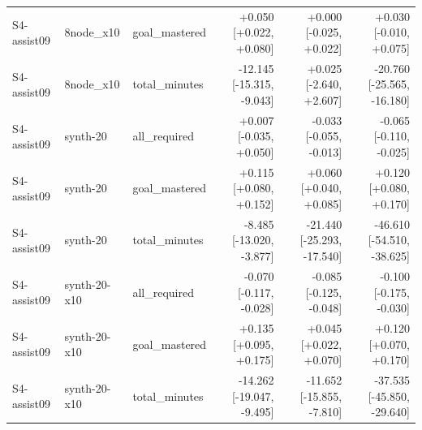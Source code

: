 \begin{table}[htbp]
\begin{tabular}{lllrrr}
S4-assist09 & 8node\_x10 & goal\_mastered & +0.050 [+0.022, +0.080] & +0.000 [-0.025, +0.022] & +0.030 [-0.010, +0.075] \\
S4-assist09 & 8node\_x10 & total\_minutes & -12.145 [-15.315, -9.043] & +0.025 [-2.640, +2.607] & -20.760 [-25.565, -16.180] \\
S4-assist09 & synth-20 & all\_required & +0.007 [-0.035, +0.050] & -0.033 [-0.055, -0.013] & -0.065 [-0.110, -0.025] \\
S4-assist09 & synth-20 & goal\_mastered & +0.115 [+0.080, +0.152] & +0.060 [+0.040, +0.085] & +0.120 [+0.080, +0.170] \\
S4-assist09 & synth-20 & total\_minutes & -8.485 [-13.020, -3.877] & -21.440 [-25.293, -17.540] & -46.610 [-54.510, -38.625] \\
S4-assist09 & synth-20-x10 & all\_required & -0.070 [-0.117, -0.028] & -0.085 [-0.125, -0.048] & -0.100 [-0.175, -0.030] \\
S4-assist09 & synth-20-x10 & goal\_mastered & +0.135 [+0.095, +0.175] & +0.045 [+0.022, +0.070] & +0.120 [+0.070, +0.170] \\
S4-assist09 & synth-20-x10 & total\_minutes & -14.262 [-19.047, -9.495] & -11.652 [-15.855, -7.810] & -37.535 [-45.850, -29.640] \\
\bottomrule
\end{tabular}
\end{table}
